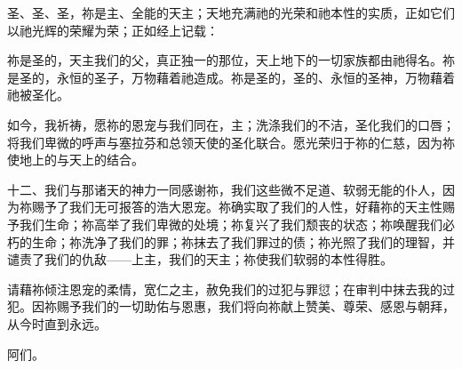 \par

\par

\par

圣、圣、圣，祢是主、全能的天主；天地充满祂的光荣和祂本性的实质，正如它们以祂光辉的荣耀为荣；正如经上记载：\par

祢是圣的，天主我们的父，真正独一的那位，天上地下的一切家族都由祂得名。祢是圣的，永恒的圣子，万物藉着祂造成。祢是圣的，圣的、永恒的圣神，万物藉着祂被圣化。\par

\newline{} \par

如今，我祈祷，愿祢的恩宠与我们同在，主；洗涤我们的不洁，圣化我们的口唇；将我们卑微的呼声与塞拉芬和总领天使的圣化联合。愿光荣归于祢的仁慈，因为祢使地上的与天上的结合。\par

\par

十二、我们与那诸天的神力一同感谢祢，我们这些微不足道、软弱无能的仆人，因为祢赐予了我们无可报答的浩大恩宠。祢确实取了我们的人性，好藉祢的天主性赐予我们生命；祢高举了我们卑微的处境；祢复兴了我们颓丧的状态；祢唤醒我们必朽的生命；祢洗净了我们的罪；祢抹去了我们罪过的债；祢光照了我们的理智，并谴责了我们的仇敌——上主，我们的天主；祢使我们软弱的本性得胜。\par

\par

请藉祢倾注恩宠的柔情，宽仁之主，赦免我们的过犯与罪愆；在审判中抹去我的过犯。因祢赐予我们的一切助佑与恩惠，我们将向祢献上赞美、尊荣、感恩与朝拜，从今时直到永远。\par

\par

阿们。\par

